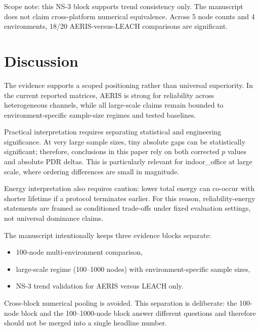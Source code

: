 \documentclass[sensors,article,submit,moreauthors,pdftex]{Definitions/mdpi}
\begin{document}
Scope note: this NS-3 block supports trend consistency only. The manuscript does not claim cross-platform numerical equivalence. Across 5 node counts and 4 environments, 18/20 AERIS-versus-LEACH comparisons are significant.

\section{Discussion}
The evidence supports a scoped positioning rather than universal superiority. In the current reported matrices, AERIS is strong for reliability across heterogeneous channels, while all large-scale claims remain bounded to environment-specific sample-size regimes and tested baselines.

Practical interpretation requires separating statistical and engineering significance. At very large sample sizes, tiny absolute gaps can be statistically significant; therefore, conclusions in this paper rely on both corrected $p$ values and absolute PDR deltas. This is particularly relevant for indoor\_office at large scale, where ordering differences are small in magnitude.

Energy interpretation also requires caution: lower total energy can co-occur with shorter lifetime if a protocol terminates earlier. For this reason, reliability-energy statements are framed as conditioned trade-offs under fixed evaluation settings, not universal dominance claims.

The manuscript intentionally keeps three evidence blocks separate:
\begin{itemize}
\item 100-node multi-environment comparison,
\item large-scale regime (100--1000 nodes) with environment-specific sample sizes,
\item NS-3 trend validation for AERIS versus LEACH only.
\end{itemize}
Cross-block numerical pooling is avoided. This separation is deliberate: the 100-node block and the 100--1000-node block answer different questions and therefore should not be merged into a single headline number.
\end{document}
